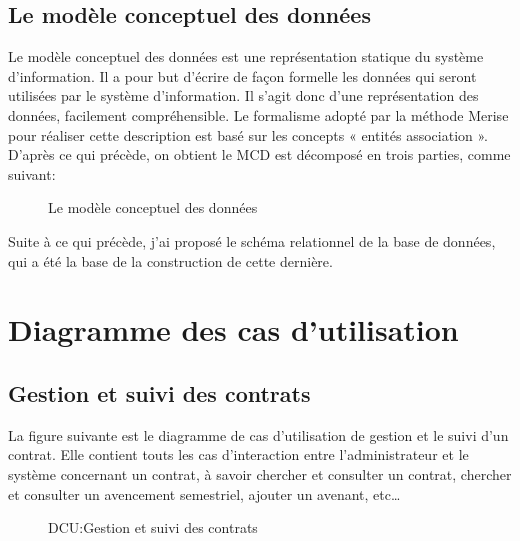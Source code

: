 \documentclass[a4paper]{report}
\begin{document}
\begin{doublespace}
	\subsection{Le modèle conceptuel des données}
	Le modèle conceptuel des données est une représentation statique du système d’information.
	Il a pour but d’écrire de façon formelle les données qui seront utilisées par le système d’information.
	Il s’agit donc d’une représentation des données, facilement compréhensible.
	Le formalisme adopté par la méthode Merise pour réaliser cette description est basé sur les concepts « entités association ».
	D’après ce qui précède, on obtient le MCD est décomposé en trois parties, comme suivant:
	\begin{figure}[H]
		\begin{center}
			\caption{Le modèle conceptuel des données}
		\end{center}
	\end{figure}
	Suite à ce qui précède, j'ai proposé le schéma relationnel de la base de données, qui a été la base de la construction de cette dernière.

	\section{Diagramme des cas d'utilisation}
	\subsection{Gestion et suivi des contrats}

	La figure suivante est le diagramme de cas d’utilisation de gestion et le suivi d'un contrat.
	Elle contient touts les cas d'interaction entre l'administrateur et le système concernant un contrat,
	à savoir chercher et consulter un contrat, chercher et consulter un avencement semestriel,
	ajouter un avenant, etc\dots
	\begin{figure}[H]
		\begin{center}
			\caption{DCU:Gestion et suivi des contrats}
		\end{center}
	\end{figure}


\end{doublespace}
\end{document}
